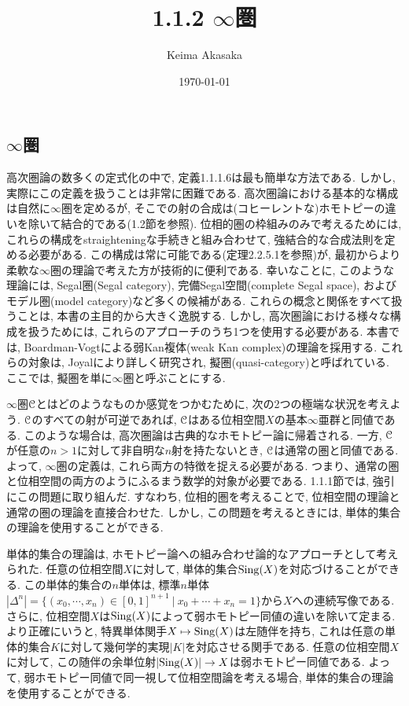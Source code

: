 \documentclass[uplatex, a4paper, 14Q, dvipdfmx]{jsreport}
\title{1.1.2 \texorpdfstring{$\infty$}{infty}圏}
\author{Keima Akasaka}
\date{\today}
\begin{document}

\setcounter{chapter}{1}
\setcounter{section}{1} 
\setcounter{subsection}{1}   
\setcounter{subsubsection}{1}

\subsection{\texorpdfstring{$\infty$}{infty}圏}

高次圏論の数多くの定式化の中で, 定義1.1.1.6は最も簡単な方法である. 
しかし, 実際にこの定義を扱うことは非常に困難である. 
高次圏論における基本的な構成は自然に$\infty$圏を定めるが, そこでの射の合成は(コヒーレントな)ホモトピーの違いを除いて結合的である(1.2節を参照).
位相的圏の枠組みのみで考えるためには, これらの構成をstraighteningな手続きと組み合わせて, 強結合的な合成法則を定める必要がある. 
この構成は常に可能である(定理2.2.5.1を参照)が, 最初からより柔軟な$\infty$圏の理論で考えた方が技術的に便利である. 
幸いなことに, このような理論には, Segal圏(Segal category), 完備Segal空間(complete Segal space), およびモデル圏(model category)など多くの候補がある. 
これらの概念と関係をすべて扱うことは, 本書の主目的から大きく逸脱する. 
しかし, 高次圏論における様々な構成を扱うためには, これらのアプローチのうち1つを使用する必要がある. 
本書では, Boardman-Vogtによる弱Kan複体(weak Kan complex)の理論を採用する. 
これらの対象は, Joyalにより詳しく研究され, 擬圏(quasi-category)と呼ばれている. 
ここでは, 擬圏を単に$\infty$圏と呼ぶことにする. 

$\infty$圏$\mathcal{C}$とはどのようなものか感覚をつかむために, 次の2つの極端な状況を考えよう. 
$\mathcal{C}$のすべての射が可逆であれば, $\mathcal{C}$はある位相空間$X$の基本$\infty$亜群と同値である. 
このような場合は, 高次圏論は古典的なホモトピー論に帰着される. 
一方, $\mathcal{C}$が任意の$n>1$に対して非自明な$n$射を持たないとき, $\mathcal{C}$は通常の圏と同値である. 
よって, $\infty$圏の定義は, これら両方の特徴を捉える必要がある. 
つまり、通常の圏と位相空間の両方のようにふるまう数学的対象が必要である. 
1.1.1節では, 強引にこの問題に取り組んだ. 
すなわち, 位相的圏を考えることで, 位相空間の理論と通常の圏の理論を直接合わせた. 
しかし, この問題を考えるときには, 単体的集合の理論を使用することができる. 

単体的集合の理論は, ホモトピー論への組み合わせ論的なアプローチとして考えられた. 
任意の位相空間$X$に対して, 単体的集合$\mathrm{Sing}(X)$を対応づけることができる. 
この単体的集合の$n$単体は, 標準$n$単体$|\Delta^n| = \{(x_0,\cdots,x_n) \in [0,1]^{n+1} ~|~ x_0 + \cdots + x_n = 1\}$から$X$への連続写像である. 
さらに, 位相空間$X$は$\mathrm{Sing}(X)$によって弱ホモトピー同値の違いを除いて定まる. 
より正確にいうと, 特異単体関手$X \mapsto \mathrm{Sing}(X)$は左随伴を持ち, これは任意の単体的集合$K$に対して幾何学的実現$|K|$を対応させる関手である. 
任意の位相空間$X$に対して, この随伴の余単位射$|\mathrm{Sing}(X)| \to X$は弱ホモトピー同値である. 
よって, 弱ホモトピー同値で同一視して位相空間論を考える場合, 単体的集合の理論を使用することができる. 
\end{document}
